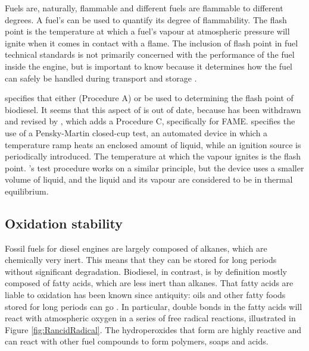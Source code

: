Fuels are, naturally, flammable and different fuels are flammable to different
degrees. A fuel's  can be used to quantify its degree of
flammability. The flash point is the temperature at which a fuel's vapour at
atmospheric pressure will ignite when it comes in contact with a flame. The
inclusion of flash point in fuel technical standards is not primarily concerned
with the performance of the fuel inside the engine, but is important to know
because it determines how the fuel can safely be handled during transport and
storage \autocite{WFCC2009}.

 specifies that either  (Procedure A) or  be used to determining the flash point of biodiesel. It seems that this
aspect of  is out of date, because  has been
withdrawn and revised by , which adds a Procedure C,
specifically for FAME.  specifies the use of a Pensky-Martin
closed-cup test, an automated device in which a temperature ramp heats an
enclosed amount of liquid, while an ignition source is periodically introduced.
The temperature at which the vapour ignites is the flash point. 's
test procedure works on a similar principle, but the device uses a smaller
volume of liquid, and the liquid and its vapour are considered to be in thermal
equilibrium.

\subsection{Oxidation stability}
\label{sec:Rancimat}

Fossil fuels for diesel engines are largely composed of alkanes, which are
chemically very inert. This means that they can be stored for long periods
without significant degradation. Biodiesel, in contrast, is by definition
\autocite[Paragraph 4.1.1]{SANS1935} mostly composed of fatty acids, which are
less inert than alkanes. That fatty acids are liable to oxidation has been known
since antiquity: oils and other fatty foods stored for long periods can go
. In particular, double bonds in the fatty acids will react with
atmospheric oxygen \autocite{Velasco2010} in a series of free radical reactions,
illustrated in Figure \ref{fig:RancidRadical}. The hydroperoxides that form are
highly reactive and can react with other fuel compounds to form polymers, soaps
and acids.

